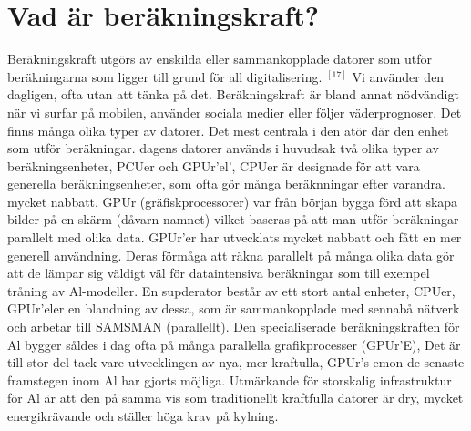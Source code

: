 {{\section*{Vad är beräkningskraft?}
Beräkningskraft utgörs av enskilda eller sammankopplade datorer som utför beräkningarna som ligger till grund för all digitalisering. \({ }^{[17]}\) Vi använder den dagligen, ofta utan att tänka på det. Beräkningskraft är bland annat nödvändigt när vi surfar på mobilen, använder sociala medier eller följer väderprognoser.
Det finns många olika typer av datorer. Det mest centrala i den atör där den enhet som utför beräkningar. dagens datorer används i huvudsak två olika typer av beräkningsenheter, PCUer och GPUr'el', CPUer är designade för att vara generella beräkningsenheter, som ofta gör många beräknningar efter varandra. mycket nabbatt. GPUr (gräfiskprocessorer) var från början bygga förd att skapa bilder på en skärm (dåvarn namnet) vilket baseras på att man utför beräkningar parallelt med olika data. GPUr'er har utvecklats mycket nabbatt och fått en mer generell användning. Deras förmåga att räkna parallelt på många olika data gör att de lämpar sig väldigt väl för dataintensiva beräkningar som till exempel tråning av Al-modeller. En supderator består av ett stort antal enheter, CPUer, GPUr'eler en blandning av dessa, som är sammankopplade med sennabå nätverk och arbetar till SAMSMAN (parallellt).
Den specialiserade beräkningskraften för Al bygger såldes i dag ofta på många parallella grafikprocesser (GPUr'E), Det är till stor del tack vare utvecklingen av nya, mer kraftulla, GPUr's emon de senaste framstegen inom Al har gjorts möjliga. Utmärkande för storskalig infrastruktur för Al är att den på samma
vis som traditionellt kraftfulla datorer är dry, mycket energikrävande och ställer höga krav på kylning.
}}
